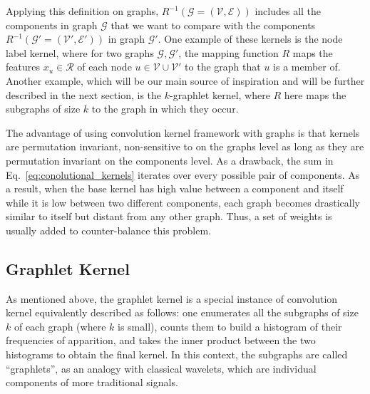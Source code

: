Applying this definition on graphs, $R^{-1}(\mathcal{G}=(\mathcal{V},\mathcal{E}))$ includes all the components in graph $\mathcal{G}$  that we want to compare with the components $R^{-1}(\mathcal{G'}=(\mathcal{V}',\mathcal{E}'))$ in graph $\mathcal{G'}$. One example of these kernels is the node label kernel, where for two graphs $\mathcal{G}, \mathcal{G'}$, the mapping function $R$ maps the features $x_u\in \mathcal{R}$ of each node $u\in \mathcal{V}\cup \mathcal{V'}$ to the graph that $u$ is a member of. Another example, which will be our main source of inspiration and will be further described in the next section, is the $k$-graphlet kernel, where $R$ here maps the subgraphs of size $k$ to the graph in which they occur.
 
The advantage of using convolution kernel framework with graphs is that kernels are permutation invariant, non-sensitive to  on the graphs level as long as they are permutation invariant on the components level. As a drawback, the sum in Eq.~\ref{eq:conolutional_kernels} iterates over every possible pair of components. As a result, when the base kernel has high value between a component and itself while it is low between two different components, each graph becomes drastically similar to itself but distant from any other graph. Thus, a set of weights is usually added to counter-balance this problem.

\subsection{Graphlet Kernel}
\label{subsection: graphlet kernel}

As mentioned above, the graphlet kernel is a special instance of convolution kernel equivalently described as follows: one enumerates all the subgraphs of size $k$ of each graph (where $k$ is small), counts them to build a histogram of their frequencies of apparition, and takes the inner product between the two histograms to obtain the final kernel. In this context, the subgraphs are called ``graphlets'', as an analogy with classical wavelets, which are individual components of more traditional signals.



